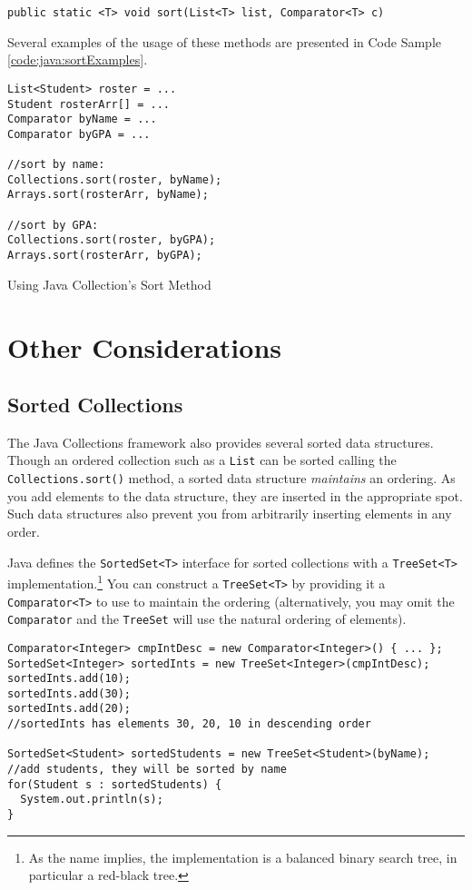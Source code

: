 \texttt{public static <T> void sort(List<T> list, Comparator<T> c)}

Several examples of the usage of these methods are presented in Code
Sample \ref{code:java:sortExamples}.

\begin{listing}[H]
\begin{verbatim}
List<Student> roster = ...
Student rosterArr[] = ...
Comparator byName = ...
Comparator byGPA = ...

//sort by name:
Collections.sort(roster, byName);
Arrays.sort(rosterArr, byName);

//sort by GPA:
Collections.sort(roster, byGPA);
Arrays.sort(rosterArr, byGPA);
\end{verbatim}
\caption{Using Java Collection's Sort Method}
\label{code:java:sortExamples}
\end{listing}

\section{Other Considerations}

\subsection{Sorted Collections}

The Java Collections framework also provides several sorted data structures.
Though an ordered collection such as a \texttt{List} can be sorted
calling the \texttt{Collections.sort()} method, a sorted data
structure \emph{maintains} an ordering.  As you add elements to 
the data structure, they are inserted in the appropriate spot.  Such data 
structures also prevent you from arbitrarily inserting elements in any 
order.  

Java defines the \texttt{SortedSet<T>} interface for sorted 
collections with a \texttt{TreeSet<T>} implementation.\footnote{As 
the name implies, the implementation is a balanced binary
search tree, in particular a red-black tree.}  You can construct a
\texttt{TreeSet<T>} by providing it a \texttt{Comparator<T>}
to use to maintain the ordering (alternatively, you may omit the
\texttt{Comparator} and the \texttt{TreeSet} will
use the natural ordering of elements).

\begin{verbatim}
Comparator<Integer> cmpIntDesc = new Comparator<Integer>() { ... };
SortedSet<Integer> sortedInts = new TreeSet<Integer>(cmpIntDesc);
sortedInts.add(10);
sortedInts.add(30);
sortedInts.add(20);
//sortedInts has elements 30, 20, 10 in descending order

SortedSet<Student> sortedStudents = new TreeSet<Student>(byName);
//add students, they will be sorted by name
for(Student s : sortedStudents) {
  System.out.println(s);
}
\end{verbatim}

